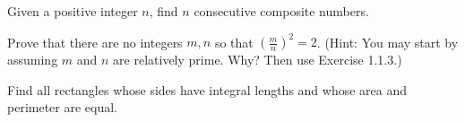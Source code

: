   \begin{exercise}[Shifrin 1.2.10]
    Given a positive integer $n$, find $n$ consecutive composite numbers.
  \end{exercise}
  \begin{solution}
    
  \end{solution}

  \begin{exercise}[Shifrin 1.2.11]
    Prove that there are no integers $m, n$ so that $(\frac{m}{n})^2 = 2$. (Hint: You may start by assuming $m$ and $n$ are relatively prime. Why? Then use Exercise 1.1.3.)
  \end{exercise}
  \begin{solution}
    
  \end{solution}

  \begin{exercise}[Shifrin 1.2.12]
    Find all rectangles whose sides have integral lengths and whose area and perimeter are equal.
  \end{exercise}
  \begin{solution}
    
  \end{solution}

